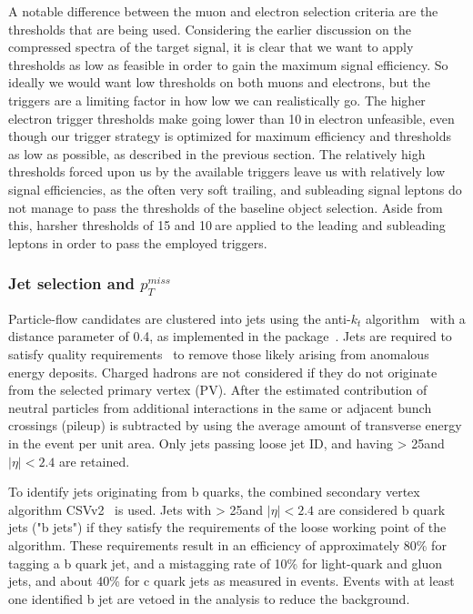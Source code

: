 A notable difference between the muon and electron selection criteria
are the \pt thresholds that are being used. Considering the earlier
discussion on the compressed \pt spectra of the target signal, it is
clear that we want to apply \pt thresholds as low as feasible in order
to gain the maximum signal efficiency. So ideally we would want low
\pt thresholds on both muons and electrons, but the triggers are a
limiting factor in how low we can realistically go. The higher
electron trigger thresholds make going lower than 10\GeV $\:$in electron \pt unfeasible, even though our trigger strategy is
optimized for maximum efficiency and thresholds as low as possible, as
described in the previous section. The relatively high \pt thresholds forced upon us by the available
triggers leave us with relatively low signal efficiencies, as the
often very soft trailing, and subleading signal leptons do not manage
to pass the thresholds of the baseline object selection.
 Aside from this, harsher \pt thresholds of 15 and 10\GeV $\:$are applied
 to the leading and subleading leptons in order to pass the employed
 triggers.

\subsubsection{Jet selection and $p_{T}^{miss}$}
Particle-flow candidates are clustered into jets using the anti-$k_t$ algorithm~\cite{Cacciari_2008} with a distance parameter of 0.4, 
as implemented in the \FASTJET package~\cite{CACCIARI200657,Cacciari_2012}. Jets are required to satisfy quality 
requirements~\cite{Chatrchyan:2011ds,Khachatryan:2016kdb,CMS-PAS-JME-16-003} to remove those likely arising from anomalous energy deposits. 
Charged hadrons are not considered if they do not originate from the selected primary vertex (PV).
After the estimated contribution of neutral particles from additional \Pp interactions in the same or adjacent bunch crossings (pileup) 
is subtracted by using the average amount of transverse energy in the event per unit area. 
Only jets passing loose jet ID, and having \pt > 25\GeV and $|\eta| < 2.4$ are retained.

To identify jets originating from b quarks, the combined secondary vertex algorithm 
CSVv2~\cite{Chatrchyan:2012jua,CMS-PAS-BTV-15-001} is used. 
Jets with \pt > 25\GeV and $|\eta| < 2.4$ are considered b quark jets ("b jets") if they satisfy the requirements 
of the loose working point of the algorithm. 
These requirements result in an efficiency of approximately 80\% for tagging a b quark jet, and a mistagging rate of 
10\% for light-quark and gluon jets, and about 40\% for c quark jets
as measured in \ttbar events. 
Events with at least one identified b jet are vetoed in the analysis to reduce the \ttbar background.

